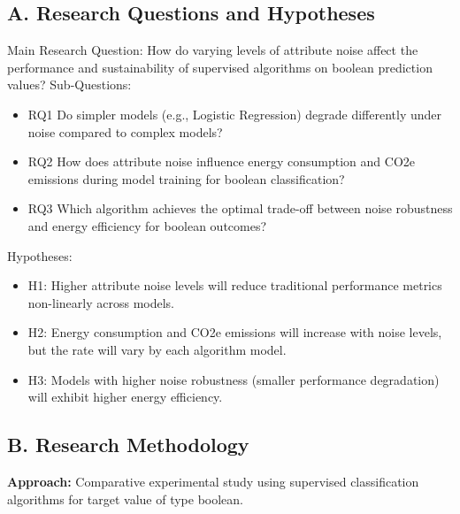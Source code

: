 \documentclass[conference]{IEEEtran}
\begin{document}
\subsection*{A. Research Questions and Hypotheses}
Main Research Question:
How do varying levels of attribute noise affect the performance and sustainability of supervised algorithms on boolean prediction values?
\newline
\newline
Sub-Questions:
\begin{itemize}
    \item RQ1 Do simpler models (e.g., Logistic Regression) degrade differently under noise compared to complex models?
    \item RQ2 How does attribute noise influence energy consumption and CO2e emissions during model training for boolean classification?
    \item RQ3 Which algorithm achieves the optimal trade-off between noise robustness and energy efficiency for boolean outcomes?
\end{itemize}
\newline
\newline
Hypotheses:
\begin{itemize}
    \item H1: Higher attribute noise levels will reduce traditional performance metrics non-linearly across models.
    \item H2: Energy consumption and CO2e emissions will increase with noise levels, but the rate will vary by each algorithm model.
    \item H3: Models with higher noise robustness (smaller performance degradation) will exhibit higher energy efficiency.
\end{itemize}
\newline
\newline
\subsection*{B. Research Methodology}
\textbf{Approach:} Comparative experimental study using supervised classification algorithms for target value of type boolean.
\newline
\end{document}
